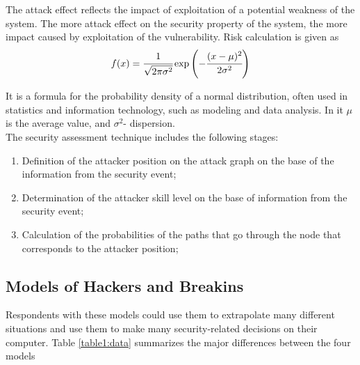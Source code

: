\documentclass{ledger}
\begin{document}
The attack effect reflects the impact of exploitation of a potential weakness of the system. The more attack effect on the security property of the system, the more impact caused by exploitation of the vulnerability. Risk calculation is given as
\begin{equation}
\label{eq:3}
  f(x)=\cfrac{1}{\sqrt{2 \pi \sigma^2}}\exp\left(-\cfrac{(x-\mu)^2}{2\sigma^2}\right)
\end{equation}

It is a formula for the probability density of a normal distribution, often used in statistics and information technology, such as modeling and data analysis. In it $\mu$ is the average value, and $\sigma^2$- dispersion.\\

The security assessment technique includes the following stages: 
\begin{enumerate}
    \item Definition of the attacker position on the attack graph on the base of the information from the security event;
    \item Determination of the attacker skill level on the base of information from the security event;
    \item Calculation of the probabilities of the paths that go through the node that corresponds to the attacker position;
\end{enumerate}




\subsection{Models of Hackers and Breakins}
Respondents with these models could use them to extrapolate many different situations and use them to make many security-related decisions on their computer. Table \ref{table1:data} summarizes the major differences between the four models  \\
\end{document}

